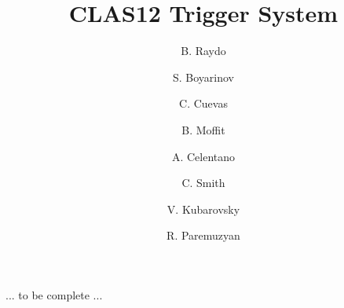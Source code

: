 \title{CLAS12 Trigger System}

\author[A]{B. Raydo}
\author[A]{S. Boyarinov}
\author[A]{C. Cuevas}
\author[A]{B. Moffit}
\author[B]{A. Celentano}
\author[A]{C. Smith}
\author[A]{V. Kubarovsky}
\author[A]{R. Paremuzyan}
... to be complete ...

\address[A]{Thomas Jefferson National Accelerator Facility, Newport News, VA, USA}
\address[B]{INFN, Milan, Italy}
